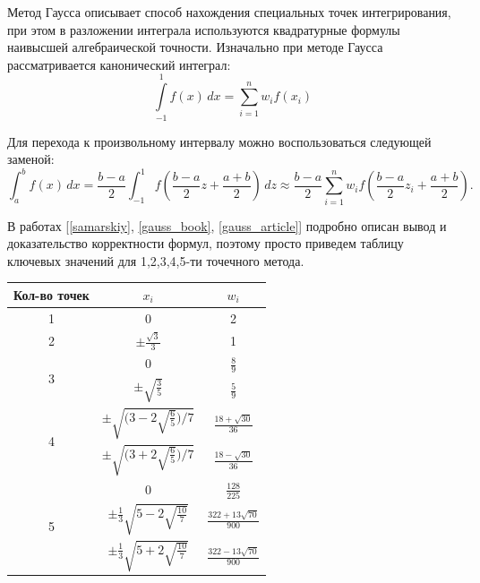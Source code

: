 Метод Гаусса описывает способ нахождения специальных точек интегрирования, при этом в разложении интеграла используются квадратурные
формулы наивысшей алгебраической точности.
Изначально при методе Гаусса рассматривается канонический интеграл:
\begin{equation}
\int\limits_{-1}^1 f(x)\, dx = \sum\limits_{i=1}^n w_i f(x_i)
\end{equation}

Для перехода к произвольному интервалу можно воспользоваться следующей заменой:
\begin{equation}
\int_a^b f(x)\,dx = \frac{b-a}{2} \int_{-1}^1 f\left(\frac{b-a}{2}z 
+ \frac{a+b}{2}\right)\,dz \approx \frac{b-a}{2} \sum_{i=1}^n w_i f\left(\frac{b-a}{2}z_i + \frac{a+b}{2}\right).
\end{equation}

В работах [\ref{samarskiy}, \ref{gauss_book}, \ref{gauss_article}] подробно описан вывод и доказательство корректности формул, поэтому просто приведем таблицу 
ключевых значений для 1,2,3,4,5-ти точечного метода.

\begin{center}

\renewcommand{\arraystretch}{2}
\begin{tabular}{|c|c|c|}
\hline
Кол-во точек    & $x_i$ & $w_i$ \\
\hline\hline
1    & 0  & 2\\[5pt] \hline
2     & $\pm\frac{\sqrt{3}}{3}$   & 1 \\[5pt] \hline
\multirow{2}{*}{3}    & 0  & $\frac 89$\\[5pt] \cline{2-3}
& $\pm \sqrt{\frac 3 5}$  & $\frac 5 9$\\[5pt] \hline

\multirow{2}{*}{4}    & $\pm\sqrt{\Big( 3 - 2\sqrt{\frac65} \Big)/7}$ & $\frac{18+\sqrt{30}}{36}$\\[5pt] \cline{2-3}
& $\pm\sqrt{\Big( 3 + 2\sqrt{\frac{6}{5}} \Big)/7}$ & $\frac{18-\sqrt{30}}{36}$\\[5pt] \hline

\multirow{3}{*}{5}    & 0 & $\frac{128}{225}$\\[5pt] \cline{2-3}
& $\pm\frac13\sqrt{5-2\sqrt{\frac{10}{7}}}$ & $\frac{322+13\sqrt{70}}{900}$\\[5pt] \cline{2-3}
& $\pm\frac13\sqrt{5+2\sqrt{\frac{10}{7}}}$ & $\frac{322-13\sqrt{70}}{900}$\\[5pt] \hline

\end{tabular}
\label{gauss_table}
\end{center}

